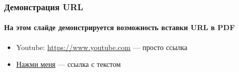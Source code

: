 \documentclass{beamer}
\begin{document}
  \begin{frame}
    \frametitle{Демонстрация URL}
	  \framesubtitle{На этом слайде демонстрируется возможность вставки URL в PDF}
	  \begin{itemize}
		  \item Youtube: \url{https://www.youtube.com} --- просто ссылка
		  \item \href{https://yandex.ru}{Нажми меня} --- ссылка с текстом
	  \end{itemize}
  \end{frame}
\end{document}
